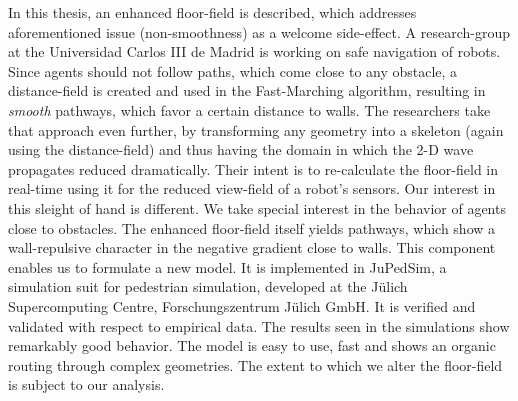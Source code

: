 In this thesis, an enhanced floor-field is described, which addresses aforementioned issue (non-smoothness) as a welcome side-effect. A research-group at the Universidad Carlos III de Madrid \citep{Madrid} is working on safe navigation of robots. Since agents should not follow paths, which come close to any obstacle, a distance-field is created and used in the Fast-Marching algorithm, resulting in \emph{smooth} pathways, which favor a certain distance to walls. The researchers take that approach even further, by transforming any geometry into a skeleton (again using the distance-field) and thus having the domain in which the 2-D wave propagates reduced dramatically. Their intent is to re-calculate the floor-field in real-time using it for the reduced view-field of a robot's sensors.
Our interest in this sleight of hand is different. We take special interest in the behavior of agents close to obstacles. The enhanced floor-field itself yields pathways, which show a wall-repulsive character in the negative gradient close to walls. This component enables us to formulate a new model. It is implemented in JuPedSim\cite{jupedsim}, a simulation suit for pedestrian simulation, developed at the J{\"u}lich Supercomputing Centre, Forschungszentrum J{\"u}lich GmbH. It is verified and validated with respect to empirical data. The results seen in the simulations show remarkably good behavior. The model is easy to use, fast and shows an organic routing through complex geometries. The extent to which we alter the floor-field is subject to our analysis.
